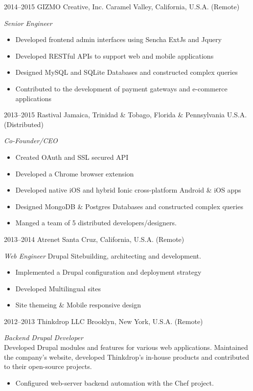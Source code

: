 \documentclass[]{friggeri-cv} %
\begin{document}
\begin{entrylist}
\entry
{2014--2015}
{GIZMO Creative, Inc.}
{Caramel Valley, California, U.S.A. (Remote)}
{\emph{Senior Engineer}
\begin{itemize}
\item Developed frontend admin interfaces using Sencha ExtJs and Jquery
\item Developed RESTful APIs to support web and mobile applications
\item Designed MySQL and SQLite Databases and constructed complex queries
\item Contributed to the development of payment gateways and e-commerce applications
\end{itemize}}
\entry
{2013--2015}
{Rastival}
{Jamaica, Trinidad \& Tobago, Florida \& Pennsylvania U.S.A. (Distributed)}
{\emph{Co-Founder/CEO}
\begin{itemize}
\item Created OAuth and SSL secured API
\item Developed a Chrome browser extension
\item Developed native iOS and hybrid Ionic cross-platform Android \& iOS apps
\item Designed MongoDB \& Postgres Databases and constructed complex queries
\item Manged a team of 5 distributed developers/designers.
\end{itemize}}
\entry
{2013--2014}
{Atrenet}
{Santa Cruz, California, U.S.A. (Remote)}
{\emph{Web Engineer}
Drupal Sitebuilding, architecting and development.
\begin{itemize}
\item Implemented a Drupal configuration and deployment strategy
\item Developed Multilingual sites
\item Site themeing \& Mobile responsive design
\end{itemize}}
\entry
{2012--2013}
{Thinkdrop LLC}
{Brooklyn, New York, U.S.A. (Remote)}
{ \emph{Backend Drupal Developer } \\
Developed Drupal modules and features for various web applications. Maintained the company's website, developed Thinkdrop's in-house products and contributed to their open-source projects.
\begin{itemize}
\item Configured web-server backend automation with the Chef project.

\end{itemize}}
\end{entrylist}
\end{document}
